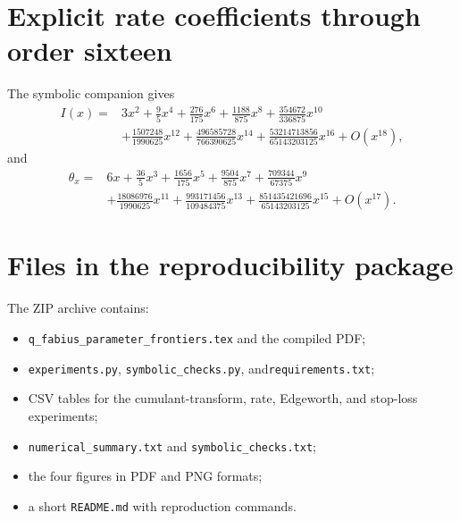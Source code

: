 \documentclass[11pt,a4paper]{article}
\theoremstyle{definition}
\begin{document}
\section{Explicit rate coefficients through order sixteen}

The symbolic companion gives
\begin{align*}
 I(x)={}&3x^2+\frac95x^4+\frac{276}{175}x^6
 +\frac{1188}{875}x^8+\frac{354672}{336875}x^{10}\\
 &+\frac{1507248}{1990625}x^{12}
 +\frac{496585728}{766390625}x^{14}
 +\frac{53214713856}{65143203125}x^{16}+O(x^{18}),
\end{align*}
and
\begin{align*}
 \theta_x={}&6x+\frac{36}{5}x^3+\frac{1656}{175}x^5
 +\frac{9504}{875}x^7+\frac{709344}{67375}x^9\\
 &+\frac{18086976}{1990625}x^{11}
 +\frac{993171456}{109484375}x^{13}
 +\frac{851435421696}{65143203125}x^{15}+O(x^{17}).
\end{align*}

\section{Files in the reproducibility package}

The ZIP archive contains:
\begin{itemize}
\item \texttt{q\_fabius\_parameter\_frontiers.tex} and the compiled PDF;
\item \texttt{experiments.py}, \texttt{symbolic\_checks.py}, and\linebreak[1] \texttt{requirements.txt};
\item CSV tables for the cumulant-transform, rate, Edgeworth, and stop-loss
experiments;
\item \texttt{numerical\_summary.txt} and
\texttt{symbolic\_checks.txt};
\item the four figures in PDF and PNG formats;
\item a short \texttt{README.md} with reproduction commands.
\end{itemize}
\end{document}
